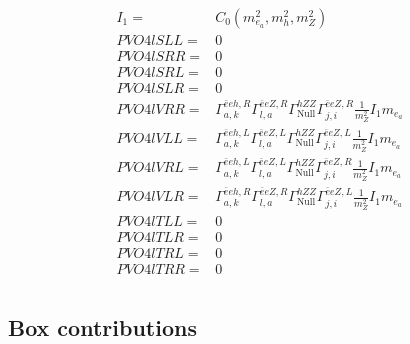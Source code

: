 \documentclass[A4,landscape]{article}
\begin{document}
\begin{align} 
I_1= & C_0(m^2_{e_{{a}}}, m^2_{h}, m^2_{Z}) \\ 
  PVO4lSLL= & 0 \\ 
  PVO4lSRR= & 0 \\ 
  PVO4lSRL= & 0 \\ 
  PVO4lSLR= & 0 \\ 
  PVO4lVRR= &  \Gamma^{\bar{e}e h ,R}_{a, k} \Gamma^{\bar{e}e Z ,R}_{l, a} \Gamma^{h Z Z }_\text{Null} \Gamma^{\bar{e}e Z ,R}_{j, i} \frac{1}{m^2_{Z}} I_1 m_{e_{{a}}} \\ 
  PVO4lVLL= &  \Gamma^{\bar{e}e h ,L}_{a, k} \Gamma^{\bar{e}e Z ,L}_{l, a} \Gamma^{h Z Z }_\text{Null} \Gamma^{\bar{e}e Z ,L}_{j, i} \frac{1}{m^2_{Z}} I_1 m_{e_{{a}}} \\ 
  PVO4lVRL= &  \Gamma^{\bar{e}e h ,L}_{a, k} \Gamma^{\bar{e}e Z ,L}_{l, a} \Gamma^{h Z Z }_\text{Null} \Gamma^{\bar{e}e Z ,R}_{j, i} \frac{1}{m^2_{Z}} I_1 m_{e_{{a}}} \\ 
  PVO4lVLR= &  \Gamma^{\bar{e}e h ,R}_{a, k} \Gamma^{\bar{e}e Z ,R}_{l, a} \Gamma^{h Z Z }_\text{Null} \Gamma^{\bar{e}e Z ,L}_{j, i} \frac{1}{m^2_{Z}} I_1 m_{e_{{a}}} \\ 
  PVO4lTLL= & 0 \\ 
  PVO4lTLR= & 0 \\ 
  PVO4lTRL= & 0 \\ 
  PVO4lTRR= & 0 \\ 
\end{align} 
\subsection{Box contributions} 
\end{document}

